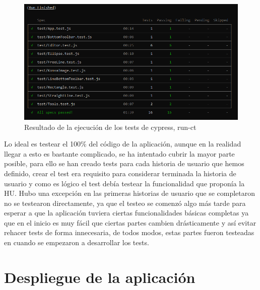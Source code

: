 \begin{figure}[!h]
  \centering
  \includegraphics[scale=0.6]{img/TestsOK.png}
  \caption{Resultado de la ejecución de los tests de cypress, run-ct}
\end{figure}

Lo ideal es testear el 100\% del código de la aplicación, aunque en la realidad llegar a esto
es bastante complicado, se ha intentado cubrir la mayor parte posible, para ello se han creado
tests para cada historia de usuario que hemos definido, crear el test era requisito para considerar
terminada la historia de usuario y como es lógico el test debía testear la funcionalidad que 
proponía la HU. Hubo una excepción en las primeras historias de usuario que se completaron
no se testearon directamente, ya que el testeo se comenzó algo más tarde para esperar a 
que la aplicación tuviera ciertas funcionalidades básicas completas ya que en el inicio es
muy fácil que ciertas partes cambien drásticamente y así evitar rehacer tests de forma innecesaria,
de todos modos, estas partes fueron testeadas en cuando se empezaron a desarrollar los tests.

\newpage
\section{Despliegue de la aplicación}


